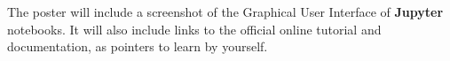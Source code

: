 \documentclass[runningheads]{llncs}
\newcommand{\Jupyter}{\textbf{Jupyter}}
\begin{document}
The poster will include a screenshot of the Graphical User Interface of \Jupyter{} notebooks.
It will also include links to the official online tutorial and documentation, as pointers to learn by yourself.







\end{document}
